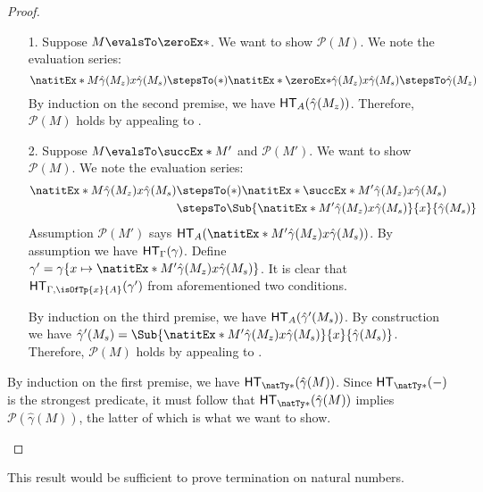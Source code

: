 \documentclass[letterpaper]{article}
\begin{document}
\begin{proof}
\begin{enumerate}
  \begin{enumerate}
    \item [1.] Suppose $M \evalsTo \zeroEx*$. We want to show $\mathcal{P}(M)$. We note the evaluation series:
    \[
      \natitEx*{M}{\hat{\gamma}(M_z)}{x}{\hat{\gamma}(M_s)} \stepsTo(*) \natitEx*{\zeroEx*}{\hat{\gamma}(M_z)}{x}{\hat{\gamma}(M_s)} \stepsTo \hat{\gamma}(M_z)
    \]
    By induction on the second premise, we have $\HT[A](\hat{\gamma}(M_z))$. Therefore, $\mathcal{P}(M)$ holds by appealing to .
    \item [2.] Suppose $M \evalsTo \succEx*{M'}$ and $\mathcal{P}(M')$. We want to show $\mathcal{P}(M)$. We note the evaluation series:
    \begin{align*}
      \natitEx*{M}{\hat{\gamma}(M_z)}{x}{\hat{\gamma}(M_s)}
      & \stepsTo(*) \natitEx*{\succEx*{M'}}{\hat{\gamma}(M_z)}{x}{\hat{\gamma}(M_s)} \\
      & \stepsTo \Sub{\natitEx*{M'}{\hat{\gamma}(M_z)}{x}{\hat{\gamma}(M_s)}}{x}{\hat{\gamma}(M_s)}
    \end{align*}
    Assumption $\mathcal{P}(M')$ says $\HT[A](\natitEx*{M'}{\hat{\gamma}(M_z)}{x}{\hat{\gamma}(M_s)})$. By assumption we have $\HT[\Gamma](\gamma)$. Define $\gamma' = \gamma\{x \mapsto \natitEx*{M'}{\hat{\gamma}(M_z)}{x}{\hat{\gamma}(M_s)}\}$. It is clear that $\HT[\Gamma, \isOfTp{x}{A}](\gamma')$ from aforementioned two conditions.

    By induction on the third premise, we have $\HT[A](\hat{\gamma}'(M_s))$. By construction we have $\hat{\gamma}'(M_s) = \Sub{\natitEx*{M'}{\hat{\gamma}(M_z)}{x}{\hat{\gamma}(M_s)}}{x}{\hat{\gamma}(M_s)}$.  Therefore, $\mathcal{P}(M)$ holds by appealing to .
  \end{enumerate}
  By induction on the first premise, we have $\HT[\natTy*](\hat{\gamma}(M))$. Since $\HT[\natTy*](-)$ is the strongest predicate, it must follow that $\HT[\natTy*](\hat{\gamma}(M))$ implies $\mathcal{P}(\hat{\gamma}(M))$, the latter of which is what we want to show.
\end{enumerate}
\end{proof}

This result would be sufficient to prove termination on natural numbers.
\end{document}
